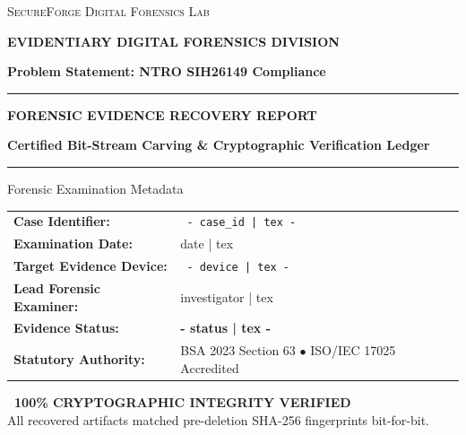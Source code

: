 \documentclass[12pt]{article}
\begin{document}

\begin{titlepage}
    \vspace*{\fill}
    \begin{center}
        {\scshape\Large SecureForge Digital Forensics Lab \par}
        \vspace{0.3cm}
        {\large\textcolor{brandprimary}{\textbf{EVIDENTIARY DIGITAL FORENSICS DIVISION}} \par}
        \vspace{0.2cm}
        {\normalsize\textbf{Problem Statement: NTRO SIH26149 Compliance} \par}
        \vspace{1.0cm}
        {\color{brandprimary}\rule{\textwidth}{2pt}} \par
        \vspace{0.5cm}
        {\huge\bfseries FORENSIC EVIDENCE RECOVERY REPORT \par}
        \vspace{0.4cm}
        {\large\textcolor{brandprimarydark}{\textbf{Certified Bit-Stream Carving \& Cryptographic Verification Ledger}} \par}
        \vspace{0.5cm}
        {\color{brandprimary}\rule{\textwidth}{2pt}} \par
        \vspace{1.0cm}
    \end{center}

    \begin{infocard}{Forensic Examination Metadata}
    \noindent
    \begin{tabularx}{\textwidth}{lX}
    \textbf{Case Identifier:} & \texttt{ {{- case_id | tex -}} } \tabularnewline
    \textbf{Examination Date:} & {{ date | tex }} \tabularnewline
    \textbf{Target Evidence Device:} & \texttt{ {{- device | tex -}} } \tabularnewline
    \textbf{Lead Forensic Examiner:} & {{ investigator | tex }} \tabularnewline
    \textbf{Evidence Status:} & \textcolor{brandsecondary}{\textbf{ {{- status | tex -}} }} \tabularnewline
    \textbf{Statutory Authority:} & BSA 2023 Section 63 $\bullet$ ISO/IEC 17025 Accredited \tabularnewline
    \end{tabularx}
    \end{infocard}

    \vspace{0.8cm}
    \begin{center}
        \small
        \textcolor{brandsecondary}{\textbf{\checkmark\ 100\% CRYPTOGRAPHIC INTEGRITY VERIFIED}} \\
        \footnotesize All recovered artifacts matched pre-deletion SHA-256 fingerprints bit-for-bit.
    \end{center}
    \vspace*{\fill}
\end{titlepage}
\end{document}
